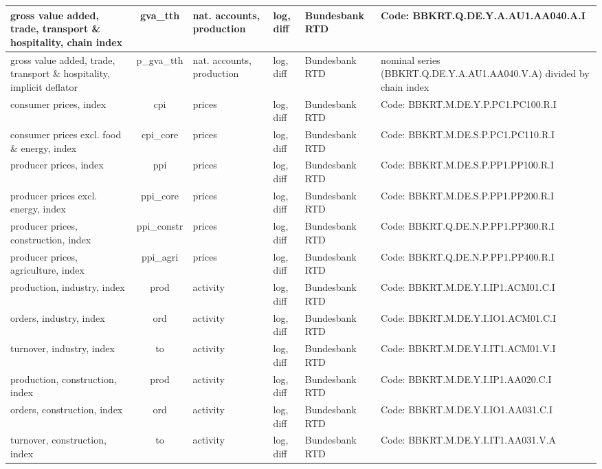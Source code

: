 \documentclass[notitlepage,a4paper,12pt]{article}
\begin{document}
\begin{ThreePartTable}
\begin{landscape}
\begin{longtable}{| l | c | l | l | l | l |}
    gross value added, trade, transport \& hospitality, chain index\tnote{s,c} & gva\_tth & nat. accounts, production & log, diff  & Bundesbank RTD & Code: BBKRT.Q.DE.Y.A.AU1.AA040.A.I\\ \hline
    gross value added, trade, transport \& hospitality, implicit deflator\tnote{s,c} & p\_gva\_tth & nat. accounts, production & log, diff  & Bundesbank RTD & nominal series (BBKRT.Q.DE.Y.A.AU1.AA040.V.A) divided by chain index\\ \hline   
    consumer prices, index\tnote{s,c} & cpi & prices & log, diff  & Bundesbank RTD & Code: BBKRT.M.DE.Y.P.PC1.PC100.R.I \\ \hline
    consumer prices excl. food \& energy, index\tnote{s,c} & cpi\_core & prices & log, diff  & Bundesbank RTD & Code: BBKRT.M.DE.S.P.PC1.PC110.R.I \\ \hline
    producer prices, index\tnote{s,c} & ppi & prices & log, diff  & Bundesbank RTD & Code: BBKRT.M.DE.S.P.PP1.PP100.R.I \\ \hline
    producer prices excl. energy, index\tnote{s,c} & ppi\_core & prices & log, diff  & Bundesbank RTD & Code: BBKRT.M.DE.S.P.PP1.PP200.R.I \\ \hline    
    producer prices, construction, index\tnote{s,c} & ppi\_constr & prices & log, diff  & Bundesbank RTD & Code: BBKRT.Q.DE.N.P.PP1.PP300.R.I \\ \hline
    producer prices, agriculture, index\tnote{s,c} & ppi\_agri & prices & log, diff  & Bundesbank RTD & Code: BBKRT.Q.DE.N.P.PP1.PP400.R.I \\ \hline 
    production, industry, index\tnote{s,c} & prod & activity & log, diff  & Bundesbank RTD & Code: BBKRT.M.DE.Y.I.IP1.ACM01.C.I \\ \hline
    orders, industry, index\tnote{s,c} & ord & activity & log, diff  & Bundesbank RTD & Code: BBKRT.M.DE.Y.I.IO1.ACM01.C.I \\ \hline
    turnover, industry, index\tnote{s,c} & to & activity & log, diff  & Bundesbank RTD & Code: BBKRT.M.DE.Y.I.IT1.ACM01.V.I \\ \hline
    production, construction, index\tnote{s,c} & prod & activity & log, diff  & Bundesbank RTD & Code: BBKRT.M.DE.Y.I.IP1.AA020.C.I \\ \hline
    orders, construction, index\tnote{s,c} & ord & activity & log, diff  & Bundesbank RTD & Code: BBKRT.M.DE.Y.I.IO1.AA031.C.I \\ \hline
    turnover, construction, index\tnote{s,c} & to & activity & log, diff  & Bundesbank RTD & Code: BBKRT.M.DE.Y.I.IT1.AA031.V.A \\ \hline

\end{longtable}
\end{landscape}
\end{ThreePartTable}
\end{document}

